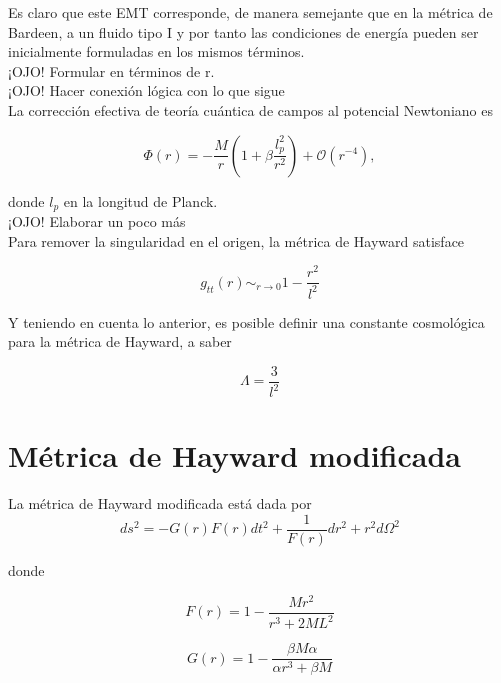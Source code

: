 \documentclass{article}
\numberwithin{equation}{section}
\begin{document}
Es claro que este EMT corresponde, de manera semejante que en la métrica de Bardeen, a un fluido tipo I y por tanto las condiciones de energía pueden ser inicialmente formuladas en los mismos términos.\\

¡OJO! Formular en términos de r.\\

¡OJO! Hacer conexión lógica con lo que sigue\\

La corrección efectiva de teoría cuántica de campos al potencial Newtoniano es

\begin{equation}
\label{newF}
\Phi (r) = -\frac{M}{r} \left( 1 + \beta \frac{l_{p}^2}{r^2} \right) + \mathcal{O}(r^{-4}),
\end{equation}

donde $l_{p}$ en la longitud de Planck.\\

¡OJO! Elaborar un poco más\\

Para remover la singularidad en el origen, la métrica de Hayward satisface 

\begin{equation}
g_{tt}(r) \sim_{r \to 0} 1 - \frac{r^2}{l^2}
\end{equation}

Y teniendo en cuenta lo anterior, es posible definir una constante cosmológica para la métrica de Hayward, a saber

\begin{equation}
\Lambda = \frac{3}{l^2}
\end{equation}

\section{Métrica de Hayward modificada}

La métrica de Hayward modificada está dada por 
\begin{equation}
\label{reg-schF}
ds^2 = -G(r)F(r) dt^2 + \frac{1}{F(r)} dr^2 + r^2d\Omega ^2
\end{equation}

donde

\begin{equation}
\label{mod-hay-f}
F(r) = 1 - \frac{Mr^2}{r^3 + 2ML^2}
\end{equation}

\begin{equation}
\label{mod-hay-g}
G(r) = 1 - \frac{\beta M \alpha}{\alpha r^3 + \beta M}
\end{equation}
\end{document}
